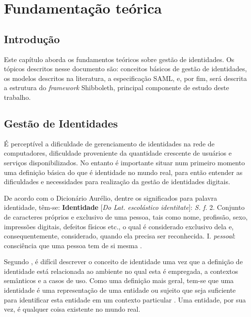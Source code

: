 \chapter{Fundamentação teórica}
\label{c_cap2}

\section{Introdução}
\label{s_c2_intro}

Este capítulo aborda os fundamentos teóricos sobre gestão de identidades. Os tópicos descritos nesse documento são: conceitos básicos de gestão de identidades, os modelos descritos na literatura, a especificação \ac{SAML}, e, por fim, será descrita a estrutura do \textit{framework} Shibboleth, principal componente de estudo deste trabalho.

\section{Gestão de Identidades}
\label{s_c2_gestaoid}

É perceptível a dificuldade de gerenciamento de identidades na rede de computadores, dificuldade proveniente da quantidade crescente de usuários e serviços disponibilizados. No entanto é importante situar num primeiro momento uma definição básica do que é identidade no mundo real, para então entender as dificuldades e necessidades para realização da gestão de identidades digitais.

De acordo com o Dicionário Aurélio, dentre os significados para palavra identidade, têm-se:
\textbf{Identidade} [\textit{Do Lat. escolástico identitate}]: \textit{S. f.} 2. Conjunto de caracteres próprios e exclusivo de uma pessoa, tais como nome, profissão, sexo, impressões digitais, defeitos físicos etc., o qual é considerado exclusivo dela e, consequentemente, considerado, quando ela precisa ser reconhecida. I. \textit{pessoal}: consciência que uma pessoa tem de si mesma \cite{ferreira:86}.

Segundo \cite{cao:10}, é difícil descrever o conceito de identidade uma vez que a definição de identidade está relacionada ao ambiente no qual esta é empregada, a contextos semânticos e a casos de uso. Como uma definição mais geral, tem-se que uma identidade é uma representação de uma entidade ou sujeito que seja suficiente para identificar esta entidade em um contexto particular \cite{maliki:07}. Uma entidade, por sua vez, é qualquer coisa existente no mundo real.

